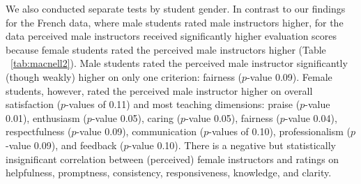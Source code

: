 \documentclass[12pt]{article}
\begin{document}
We also conducted separate tests by student gender.
In contrast to our findings for the French data, where male students 
rated male instructors higher, 
for the \citet{MacNell2014} data perceived male instructors received 
significantly higher evaluation scores because female students rated the perceived 
male instructors higher (Table ~\ref{tab:macnell2}). 
Male students rated the perceived male instructor significantly (though weakly) 
higher on only one criterion: fairness ($p$-value 0.09). 
Female students, however, rated the perceived male instructor higher on overall satisfaction 
($p$-values of 0.11) and most teaching dimensions: 
praise ($p$-value 0.01), 
enthusiasm ($p$-value 0.05), 
caring ($p$-value 0.05), 
fairness ($p$-value 0.04), 
respectfulness ($p$-value 0.09),  
communication ($p$-values of 0.10), 
professionalism ($p$-value 0.09), 
and feedback ($p$-value 0.10). 
There is a negative but statistically insignificant correlation between (perceived) 
female instructors
and ratings on helpfulness, promptness, consistency, responsiveness, 
knowledge, and clarity.
\end{document}
